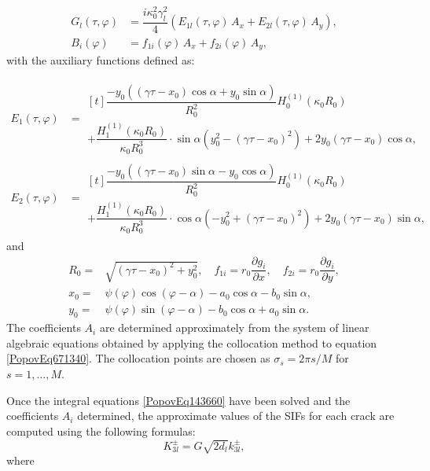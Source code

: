 \begin{align*}
	G_l(\tau, \varphi) &= \dfrac{i \kappa_0^2 \gamma_l^2}{4} \left( E_{1l}(\tau, \varphi)\, A_x + E_{2l}(\tau, \varphi)\, A_y \right),
	\\
	B_i(\varphi) &= f_{1i}(\varphi)\, A_x + f_{2i}(\varphi)\, A_y,
\end{align*}
%
with the auxiliary functions defined as:

\begin{align*}
	E_1(\tau, \varphi)  &=
	\begin{multlined}[t]
		\dfrac{-y_0\left((\gamma \tau - x_0)\cos \alpha + y_0 \sin \alpha \right)}{R_0^2} H_0^{(1)}(\kappa_0 R_0)
		\\
		+ \dfrac{H_1^{(1)}(\kappa_0 R_0)}{\kappa_0 R_0^3} \cdot \sin \alpha \left( y_0^2 - (\gamma \tau - x_0)^2 \right) + 2 y_0 (\gamma \tau - x_0) \cos \alpha,
	\end{multlined}
	\\
	E_2(\tau, \varphi) &= 
	\begin{multlined}[t]
		\dfrac{-y_0\left((\gamma \tau - x_0)\sin \alpha - y_0 \cos \alpha \right)}{R_0^2} H_0^{(1)}(\kappa_0 R_0)
		\\
		+ \dfrac{H_1^{(1)}(\kappa_0 R_0)}{\kappa_0 R_0^3} \cdot \cos \alpha \left( -y_0^2 + (\gamma \tau - x_0)^2 \right) + 2 y_0 (\gamma \tau - x_0) \sin \alpha,
	\end{multlined}
\end{align*}
%
and
\[
\begin{array}{rl}
	R_0 =& \sqrt{(\gamma \tau - x_0)^2 + y_0^2}, \quad
	f_{1i} = r_0 \dfrac{\partial g_i}{\partial x}, \quad
	f_{2i} = r_0 \dfrac{\partial g_i}{\partial y}, \\[0.5em]
	x_0 =& \psi(\varphi)\cos(\varphi - \alpha) - a_0 \cos \alpha - b_0 \sin \alpha, \\[0.5em]
	y_0 =& \psi(\varphi)\sin(\varphi - \alpha) - b_0 \cos \alpha + a_0 \sin \alpha.
\end{array}
\]
The coefficients \( A_i \) are determined approximately from the system of linear algebraic equations obtained by applying the collocation method to equation \eqref{PopovEq671340}. The collocation points are chosen as \( \sigma_s = 2\pi s / M \) for \( s = 1, \dots, M \). 

Once the integral equations \eqref{PopovEq143660} have been solved and the coefficients \( A_i \) determined, the approximate values of the SIFs for each crack are computed using the following formulas:
\begin{equation} \label{31.28)} 
	K_{3l}^{\pm} = G \sqrt{2d_l} k_{3l}^{\pm},
\end{equation}
where

